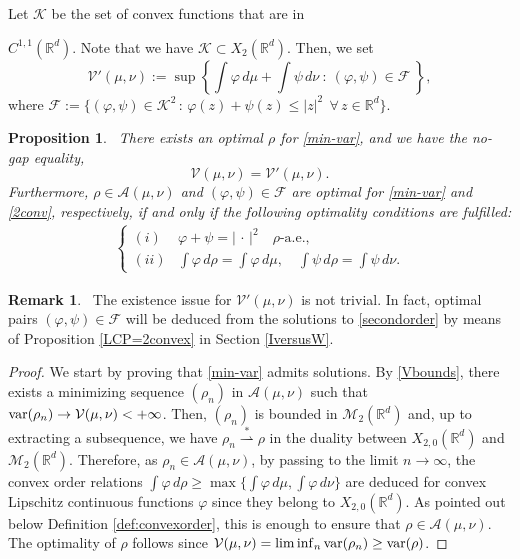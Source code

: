 \documentclass[11pt,letterpaper,reqno]{amsart}
\newtheorem{proposition}[theorem]{Proposition}
\theoremstyle{definition}
\newtheorem{remark}[theorem]{Remark}
\numberwithin{equation}{section}
\def\f{\varphi}
\newcommand{\R}{\mathbb{R}}
\newcommand{\Rd}{\R^d}
\newcommand{\A}{\mathcal{A}}
\newcommand{\K}{\mathcal{K}}
\newcommand{\FF}{\mathcal{F}}
\newcommand{\var}{{\rm{var}}}
\newcommand{\weakstar}{{\overset{\ast}{\rightharpoonup}}}
\newcommand{\argu}{{\,\cdot\,}}
\newcommand{\Mes}{{\mathcal{M}}}
\newcommand{\abs}[1]{{\left \lvert #1 \right \rvert}}
\newcommand{\V}{{\mathcal{V}}}
\begin{document}
    Let $\K$ be the set of convex functions that are in {$C^{1,1}(\Rd)$. Note that we have $\K\subset X_2(\R^d)$.  Then, we set 
\begin{equation}\label{2conv}
\V'(\mu,\nu) := \sup \left\{ \int \f\, d\mu + \int \psi\, d\nu \ :\ (\f,\psi)\in \FF\ \right\},
\end{equation}
where $\FF:=\big\{(\f,\psi)\in \K^2 \, :\, {\f(z)+\psi(z) \le \abs{z}^2 \ \ \forall\, z \in \Rd } \big\}$.
 \begin{proposition}\label{duality-2convex} \ There exists an optimal $\rho$ for \eqref{min-var}, and we have the no-gap equality,
 $$  \V(\mu,\nu)  = \V'(\mu,\nu) .$$
 Furthermore, $\rho\in\A(\mu,\nu) $ and $(\f,\psi)\in \FF$ are optimal for \eqref{min-var} and \eqref{2conv}, respectively,
if and only if the following optimality conditions are fulfilled:
	\begin{align}
		\label{eq:opt_cond_rho1}
		\begin{cases}
			(i) &  \varphi + \psi = \abs{\argu}^2 \quad \text{$\rho$-a.e.},\\
			(ii) & \int \varphi \, d\rho=  \int \varphi \, d\mu, \quad \int \psi \, d\rho=  \int \psi \, d\nu.
		\end{cases}
	\end{align}	
\end{proposition}

\begin{remark}\label{existence?}\ The existence issue  for $\V'(\mu,\nu)$ is not trivial. In fact,  optimal pairs $(\f,\psi)\in \FF$ will be deduced from  the solutions to \eqref{secondorder} by means  of   Proposition \ref{LCP=2convex}
 in Section \ref{IversusW}.
 \end{remark}
 


\begin{proof}  We start by proving that \eqref{min-var} admits solutions. 
 By \eqref{Vbounds}, there exists a minimizing sequence $(\rho_n)$ in $\A(\mu,\nu)$ such that
$\var(\rho_n)\to \V(\mu,\nu) <+\infty$. Then, $(\rho_n)$ is bounded in $\Mes_2(\R^d)$ and, up to extracting a subsequence, 
we have $\rho_n\weakstar \rho$ in the duality between $X_{2,0}(\R^d)$ and  $\Mes_2(\R^d)$. Therefore, as $\rho_n\in\A(\mu,\nu)$, by passing to the limit $n\to\infty$, the convex order relations  $\int \varphi\, d\rho \ge \max\{\int \varphi\, d\mu, \int \varphi\, d\nu\}$ are deduced for convex Lipschitz continuous functions $\varphi$ since they belong to $X_{2,0}(\R^d)$.  As pointed out below Definition \ref{def:convexorder}, this is enough to ensure that $\rho\in\A(\mu,\nu)$. The optimality of $\rho$ follows 
since $\V(\mu,\nu)=\liminf_n \var(\rho_n)\ge \var(\rho)$. 


\end{proof}}
\end{document}
